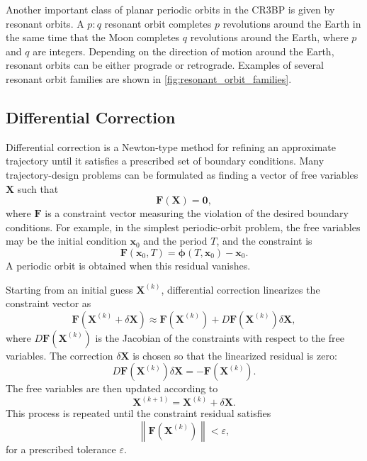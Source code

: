 Another important class of planar periodic orbits in the CR3BP is given by resonant orbits. 
A $p:q$ resonant orbit completes $p$ revolutions around the Earth in the same time that the Moon completes $q$ revolutions around the Earth, where $p$ and $q$ are integers. 
Depending on the direction of motion around the Earth, resonant orbits can be either prograde or retrograde. 
Examples of several resonant orbit families are shown in \cref{fig:resonant_orbit_families}.
\subsection{Differential Correction}
Differential correction is a Newton-type method for refining an approximate trajectory until it satisfies a prescribed set of boundary conditions. 
Many trajectory-design problems can be formulated as finding a vector of free variables $\boldsymbol{X}$ such that
\[
    \boldsymbol{F}(\boldsymbol{X}) = \boldsymbol{0},
\]
where $\boldsymbol{F}$ is a constraint vector measuring the violation of the desired boundary conditions.
For example, in the simplest periodic-orbit problem, the free variables may be the initial condition $\boldsymbol{x}_0$ and the period $T$, and the constraint is
\[
    \boldsymbol{F}(\boldsymbol{x}_0,T)
    =
    \boldsymbol{\phi}(T,\boldsymbol{x}_0)-\boldsymbol{x}_0.
\]
A periodic orbit is obtained when this residual vanishes.

Starting from an initial guess $\boldsymbol{X}^{(k)}$, differential correction linearizes the constraint vector as
\[
    \boldsymbol{F}(\boldsymbol{X}^{(k)}+\delta\boldsymbol{X})
    \approx
    \boldsymbol{F}(\boldsymbol{X}^{(k)})
    +
    D\boldsymbol{F}(\boldsymbol{X}^{(k)})\delta\boldsymbol{X},
\]
where $D\boldsymbol{F}(\boldsymbol{X}^{(k)})$ is the Jacobian of the constraints with respect to the free variables. 
The correction $\delta\boldsymbol{X}$ is chosen so that the linearized residual is zero:
\begin{equation}
\label{eq: differential correction}
    D\boldsymbol{F}(\boldsymbol{X}^{(k)})\delta\boldsymbol{X}
    =
    -\boldsymbol{F}(\boldsymbol{X}^{(k)}).
\end{equation}
The free variables are then updated according to
\begin{equation}
    \label{eq: DC Step}
    \boldsymbol{X}^{(k+1)}
    =
    \boldsymbol{X}^{(k)}
    +
    \delta\boldsymbol{X}.
\end{equation}
This process is repeated until the constraint residual satisfies
\[
    \left\|\boldsymbol{F}(\boldsymbol{X}^{(k)})\right\| < \varepsilon,
\]
for a prescribed tolerance $\varepsilon$.


